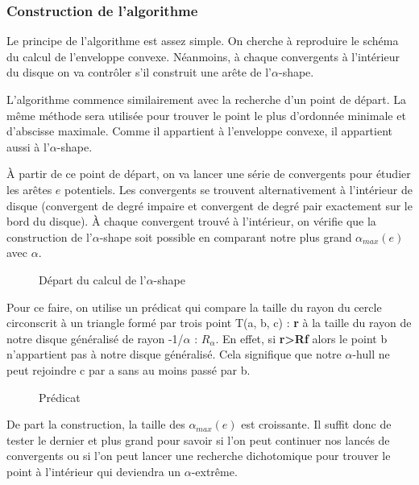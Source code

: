 \subsubsection{Construction de l'algorithme}

Le principe de l’algorithme est assez simple. On cherche à reproduire le schéma du calcul de l’enveloppe convexe. Néanmoins, à chaque convergents à l'intérieur du disque on va contrôler s'il construit une arête de l'$\alpha$-shape.

L'algorithme commence similairement avec la recherche d'un point de départ. La même méthode sera utilisée pour trouver le point le plus d'ordonnée minimale et d'abscisse maximale. Comme il appartient à l'enveloppe convexe, il appartient aussi à l'$\alpha$-shape.

À partir de ce point de départ, on va lancer une série de convergents pour étudier les arêtes $e$ potentiels. Les convergents se trouvent alternativement à l'intérieur de disque (convergent de degré impaire et convergent de degré pair exactement sur le bord du disque). À chaque convergent trouvé à l'intérieur, on vérifie que la construction de l'$\alpha$-shape soit possible en comparant notre plus grand $\alpha_{max}(e)$ avec $\alpha$. 

\begin{figure}[h!]
  \centering
  \caption{Départ du calcul de l'$\alpha$-shape}
\end{figure}

Pour ce faire, on utilise un prédicat qui compare la taille du rayon du cercle circonscrit à un triangle formé par trois point T(a, b, c) : \textbf{r} à la taille du rayon de notre disque généralisé de rayon -1/$\alpha$ : \textbf{$R_{\alpha}$}. En effet, si \textbf{r>Rf} alors le point b n'appartient pas à notre disque généralisé. Cela signifique que notre $\alpha$-hull ne peut rejoindre c par a sans au moins passé par b.


\begin{figure}[h!]
  \centering
  \caption{Prédicat}
\end{figure}

De part la construction, la taille des $\alpha_{max}(e)$ est croissante. Il suffit donc de tester le dernier et plus grand pour savoir si l'on peut continuer nos lancés de convergents ou si l'on peut lancer une recherche dichotomique pour trouver le point à l'intérieur qui deviendra un $\alpha$-extrême.

